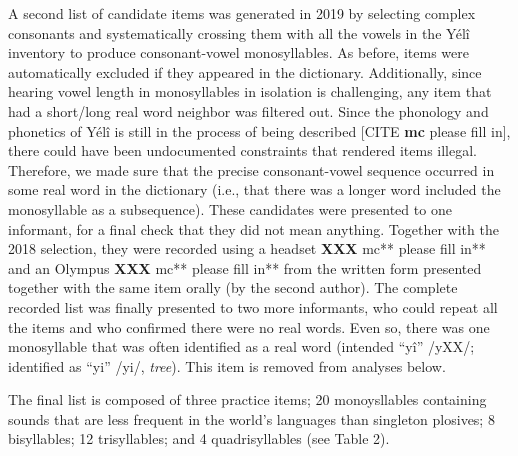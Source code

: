 \documentclass[english,,man,floatsintext]{apa6}
\begin{document}
A second list of candidate items was generated in 2019 by selecting
complex consonants and systematically crossing them with all the vowels
in the Yélî inventory to produce consonant-vowel monosyllables. As
before, items were automatically excluded if they appeared in the
dictionary. Additionally, since hearing vowel length in monosyllables in
isolation is challenging, any item that had a short/long real word
neighbor was filtered out. Since the phonology and phonetics of Yélî is
still in the process of being described {[}CITE \textbf{mc} please fill
in{]}, there could have been undocumented constraints that rendered
items illegal. Therefore, we made sure that the precise consonant-vowel
sequence occurred in some real word in the dictionary (i.e., that there
was a longer word included the monosyllable as a subsequence). These
candidates were presented to one informant, for a final check that they
did not mean anything. Together with the 2018 selection, they were
recorded using a headset \textbf{XXX }mc** please fill in** and an
Olympus \textbf{XXX }mc** please fill in** from the written form
presented together with the same item orally (by the second author). The
complete recorded list was finally presented to two more informants, who
could repeat all the items and who confirmed there were no real words.
Even so, there was one monosyllable that was often identified as a real
word (intended ``yî'' /yXX/; identified as ``yi'' /yi/, \emph{tree}).
This item is removed from analyses below.

The final list is composed of three practice items; 20 monoysllables
containing sounds that are less frequent in the world's languages than
singleton plosives; 8 bisyllables; 12 trisyllables; and 4
quadrisyllables (see Table 2).
\end{document}
